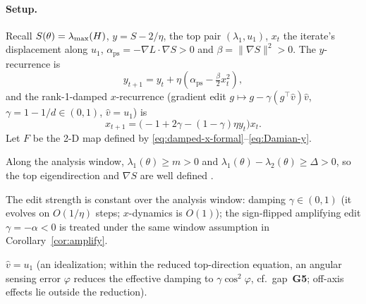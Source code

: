 \paragraph{Setup.}
Recall $S(\theta)=\lambda_{\max}(H)$, $y=S-2/\eta$, the top pair $(\lambda_{1},u_{1})$,
$x_{t}$ the iterate's displacement along $u_{1}$,
$\alpha_{\mathrm{ps}}=-\nabla L\!\cdot\!\nabla S>0$
and $\beta=\|\nabla S\|^{2}>0$. The $y$-recurrence is
\begin{equation}\label{eq:Damian-y}
y_{t+1}=y_{t}+\eta\!\left(\alpha_{\mathrm{ps}}-\tfrac{\beta}{2}x_{t}^{2}\right),
\end{equation}
and the rank-1-damped $x$-recurrence (gradient edit
$g\mapsto g-\gamma(g^{\top}\hat v)\hat v$, $\gamma=1-1/d\in(0,1)$, $\hat v=u_{1}$)
is
\begin{equation}\label{eq:damped-x-formal}
x_{t+1}=\bigl(-1+2\gamma-(1-\gamma)\eta y_{t}\bigr)x_{t}.
\end{equation}
Let $F$ be the 2-D map defined by \eqref{eq:damped-x-formal}--\eqref{eq:Damian-y}.

\begin{assumption}
Along the analysis window, $\lambda_{1}(\theta)\geq m>0$ and
$\lambda_{1}(\theta)-\lambda_{2}(\theta)\geq\Delta>0$, so the top eigendirection
and $\nabla S$ are well defined \citep{damian2023selfstab}.
\end{assumption}

\begin{assumption}
The edit strength is constant over the analysis window: damping
$\gamma\in(0,1)$ (it evolves on $O(1/\eta)$ steps; $x$-dynamics is
$O(1)$); the sign-flipped amplifying edit $\gamma=-\alpha<0$ is treated
under the same window assumption in Corollary~\ref{cor:amplify}.
\end{assumption}

\begin{assumption}
$\hat v=u_{1}$ (an idealization; within the reduced top-direction equation,
an angular sensing error $\varphi$ reduces the effective damping to
$\gamma\cos^{2}\varphi$, cf.\ gap~\textbf{G5}; off-axis effects lie outside
the reduction).
\end{assumption}

